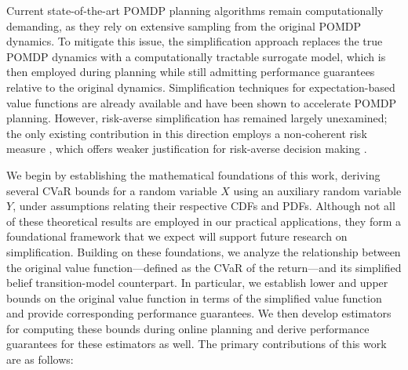 \documentclass[acmlarge, manuscript, screen, review, natbib=false, oneside]{acmart}
\begin{document}
Current state-of-the-art POMDP planning algorithms remain computationally demanding, as they rely on extensive sampling from the original POMDP dynamics. To mitigate this issue, the simplification approach replaces the true POMDP dynamics with a computationally tractable surrogate model, which is then employed during planning while still admitting performance guarantees relative to the original dynamics. Simplification techniques for expectation-based value functions are already available \cite{LevYehudi24aaai, barenboim2023NIPS, andrey_ori} and have been shown to accelerate POMDP planning. However, risk-averse simplification has remained largely unexamined; the only existing contribution in this direction employs a non-coherent risk measure \cite{Zhitnikov22ai}, which offers weaker justification for risk-averse decision making \cite{majumdar2020should}.

We begin by establishing the mathematical foundations of this work, deriving several CVaR bounds for a random variable $X$ using an auxiliary random variable $Y$, under assumptions relating their respective CDFs and PDFs. Although not all of these theoretical results are employed in our practical applications, they form a foundational framework that we expect will support future research on simplification.
Building on these foundations, we analyze the relationship between the original value function—defined as the CVaR of the return—and its simplified belief transition-model counterpart. In particular, we establish lower and upper bounds on the original value function in terms of the simplified value function and provide corresponding performance guarantees. We then develop estimators for computing these bounds during online planning and derive performance guarantees for these estimators as well. The primary contributions of this work are as follows:
\end{document}

